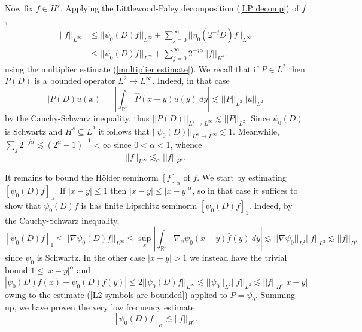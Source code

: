 \documentclass[10pt]{article}
\newcommand{\RR}{\mathbb{R}}
\theoremstyle{definition}
\begin{document}
Now fix $f \in H^s$.
Applying the Littlewood-Paley decomposition (\ref{LP decomp}) of $f$,
\begin{align*}
||f||_{L^\infty} &\leq ||\psi_0(D)f||_{L^\infty} + \sum_{j=0}^\infty ||\eta_0(2^{-j}D)f||_{L^\infty}\\
&\leq ||\psi_0(D)f||_{L^\infty} + \sum_{j=0}^\infty 2^{-j\alpha} ||f||_{H^s}.
\end{align*}
using the multiplier estimate (\ref{multiplier estimate}).
We recall that if $P \in L^2$ then $P(D)$ is a bounded operator $L^2 \to L^\infty$. Indeed, in that case
\begin{equation}
\label{L2 symbols are bounded}
|P(D)u(x)| = \left|\int_{\RR^d} \hat P(x - y) u(y) ~dy\right| \lesssim ||P||_{L^2} ||u||_{L^2}
\end{equation}
by the Cauchy-Schwarz inequality, thus $||P(D)||_{L^2 \to L^\infty} \lesssim ||P||_{L^2}$. Since $\psi_0(D)$ is Schwartz and $H^s \subseteq L^2$ it follows that $||\psi_0(D)||_{H^s \to L^\infty} \lesssim 1$.
Meanwhile, $\sum_j 2^{-j\alpha} \lesssim (2^\alpha - 1)^{-1} < \infty$ since $0 < \alpha < 1$, whence
\begin{equation}
\label{sup estimate}
||f||_{L^\infty} \lesssim_\alpha ||f||_{H^s}.
\end{equation}

It remains to bound the H\"older seminorm $[f]_\alpha$ of $f$.
We start by estimating $[\psi_0(D)f]_\alpha$. If $|x - y| \leq 1$ then $|x - y| \leq |x - y|^\alpha$, so in that case it suffices to show that $\psi_0(D)f$ is has finite Lipschitz seminorm $[\psi_0(D)f]_1$.
Indeed, by the Cauchy-Schwarz inequality,
$$[\psi_0(D)f]_1 \leq ||\nabla \psi_0(D) f||_{L^\infty} \leq \sup_x \left|\int_{\RR^d} \nabla_x \psi_0(x - y) \hat f(y) ~dy\right| \lesssim ||\nabla \psi_0||_{L^2} ||f||_{L^2} \lesssim ||f||_{H^s}$$
since $\psi_0$ is Schwartz.
In the other case $|x - y| > 1$ we instead have the trivial bound $1 \leq |x - y|^\alpha$ and
$$|\psi_0(D)f(x) - \psi_0(D)f(y)| \leq 2||\psi_0(D)f||_{L^\infty} \lesssim ||\psi_0||_{L^2} ||f||_{L^2} \lesssim ||f||_{H^s} |x - y|$$
owing to the estimate (\ref{L2 symbols are bounded}) applied to $P = \psi_0$.
Summing up, we have proven the very low frequency estimate
\begin{equation}
\label{very low frequency estimate}
[\psi_0(D)f]_\alpha \lesssim ||f||_{H^s}.
\end{equation}
\end{document}
